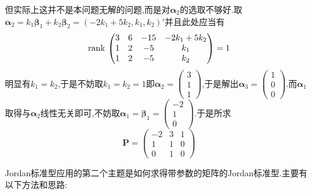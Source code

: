 {\begin{solution}
        但实际上这并不是本问题无解的问题,而是对$\bm{\alpha}_2$的选取不够好.取$\bm{\alpha}_2=k_1\bm{\beta}_1+k_2\bm{\beta}_2=\left(
            -2k_1+5k_2,k_1,k_2
            \right)'$并且此处应当有\[
            \operatorname{rank\,} \begin{pmatrix}
                3 & 6 & -15 & -2k_1+5k_2 \\1&2&-5&k_1\\1 & 2 & -5 & k_2
            \end{pmatrix}=1
        \]明显有$k_1=k_2$,于是不妨取$k_1=k_2=1$即$\bm{\alpha}_2=\begin{pmatrix}
                3 \\1\\1
            \end{pmatrix}$,于是解出$\bm{\alpha}_3=\begin{pmatrix}
                1 \\0\\0
            \end{pmatrix}$.而$\bm{\alpha}_1$取得与$\bm{\alpha}_2$线性无关即可,不妨取$\bm{\alpha}_1=\bm{\beta}_1=\begin{pmatrix}
                -2 \\1\\0
            \end{pmatrix}$.于是所求\[
            \bm{P}= \begin{pmatrix}
                -2 & 3 & 1 \\1&1&0\\0 & 1 & 0
            \end{pmatrix}
        \]
    \end{solution}
}
Jordan标准型应用的第二个主题是如何求得带参数的矩阵的Jordan标准型.主要有以下方法和思路:

